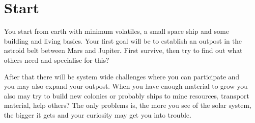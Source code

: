\section{Start}

You start from earth with minimum volatiles, a small space ship and some building and living basics. 
Your first goal will be to establish an outpost in the astroid belt between Mars and
Jupiter. First survive, then try to find out what others need and specialise for this? 

After that there will be system wide challenges where you can participate and you may also expand
your outpost. When you have enough material to grow you also may try to build new colonies or
probably ships to mine resources, transport material, help others? The only problems is,
the more you see of the solar system, the bigger it gets and your curiosity may get you into
trouble.

